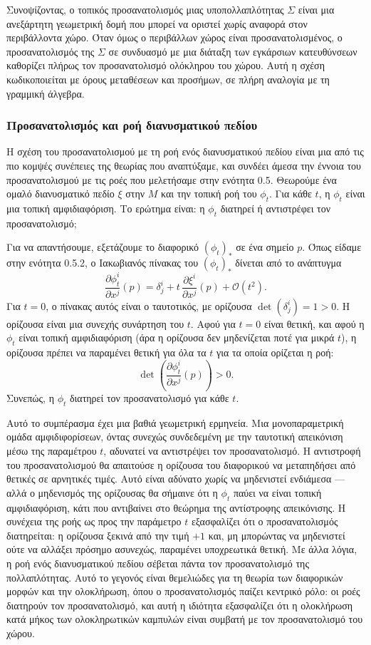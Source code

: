 \documentclass[12pt]{article}
\begin{document}
Συνοψίζοντας, ο τοπικός προσανατολισμός μιας υποπολλαπλότητας $\Sigma$ είναι μια ανεξάρτητη γεωμετρική δομή που μπορεί να οριστεί χωρίς αναφορά στον περιβάλλοντα χώρο. Όταν όμως ο περιβάλλων χώρος είναι προσανατολισμένος, ο προσανατολισμός της $\Sigma$ σε συνδυασμό με μια διάταξη των εγκάρσιων κατευθύνσεων καθορίζει πλήρως τον προσανατολισμό ολόκληρου του χώρου. Αυτή η σχέση κωδικοποιείται με όρους μεταθέσεων και προσήμων, σε πλήρη αναλογία με τη γραμμική άλγεβρα.

\subsubsection{Προσανατολισμός και ροή διανυσματικού πεδίου}

Η σχέση του προσανατολισμού με τη ροή ενός διανυσματικού πεδίου είναι μια από τις πιο κομψές συνέπειες της θεωρίας που αναπτύξαμε, και συνδέει άμεσα την έννοια του προσανατολισμού με τις ροές που μελετήσαμε στην ενότητα 0.5. Θεωρούμε ένα ομαλό διανυσματικό πεδίο $\xi$ στην $M$ και την τοπική ροή του $\phi_t$. Για κάθε $t$, η $\phi_t$ είναι μια τοπική αμφιδιαφόριση. Το ερώτημα είναι: η $\phi_t$ διατηρεί ή αντιστρέφει τον προσανατολισμό;

Για να απαντήσουμε, εξετάζουμε το διαφορικό $(\phi_t)_*$ σε ένα σημείο $p$. Όπως είδαμε στην ενότητα 0.5.2, ο Ιακωβιανός πίνακας του $(\phi_t)_*$ δίνεται από το ανάπτυγμα
\[
\frac{\partial \phi_t^i}{\partial x^j}(p) = \delta^i_j + t \, \frac{\partial \xi^i}{\partial x^j}(p) + \mathcal{O}(t^2).
\]
Για $t = 0$, ο πίνακας αυτός είναι ο ταυτοτικός, με ορίζουσα $\det(\delta^i_j) = 1 > 0$. Η ορίζουσα είναι μια συνεχής συνάρτηση του $t$. Αφού για $t = 0$ είναι θετική, και αφού η $\phi_t$ είναι τοπική αμφιδιαφόριση (άρα η ορίζουσα δεν μηδενίζεται ποτέ για μικρά $t$), η ορίζουσα πρέπει να παραμένει θετική για όλα τα $t$ για τα οποία ορίζεται η ροή:
\[
\det \left( \frac{\partial \phi_t^i}{\partial x^j}(p) \right) > 0.
\]
Συνεπώς, η $\phi_t$ διατηρεί τον προσανατολισμό για κάθε $t$.

Αυτό το συμπέρασμα έχει μια βαθιά γεωμετρική ερμηνεία. Μια μονοπαραμετρική ομάδα αμφιδιφορίσεων, όντας συνεχώς συνδεδεμένη με την ταυτοτική απεικόνιση μέσω της παραμέτρου $t$, αδυνατεί να αντιστρέψει τον προσανατολισμό. Η αντιστροφή του προσανατολισμού θα απαιτούσε η ορίζουσα του διαφορικού να μεταπηδήσει από θετικές σε αρνητικές τιμές. Αυτό είναι αδύνατο χωρίς να μηδενιστεί ενδιάμεσα --- αλλά ο μηδενισμός της ορίζουσας θα σήμαινε ότι η $\phi_t$ παύει να είναι τοπική αμφιδιαφόριση, κάτι που αντιβαίνει στο θεώρημα της αντίστροφης απεικόνισης. Η συνέχεια της ροής ως προς την παράμετρο $t$ εξασφαλίζει ότι ο προσανατολισμός διατηρείται: η ορίζουσα ξεκινά από την τιμή $+1$ και, μη μπορώντας να μηδενιστεί ούτε να αλλάξει πρόσημο ασυνεχώς, παραμένει υποχρεωτικά θετική. Με άλλα λόγια, η ροή ενός διανυσματικού πεδίου σέβεται πάντα τον προσανατολισμό της πολλαπλότητας. Αυτό το γεγονός είναι θεμελιώδες για τη θεωρία των διαφορικών μορφών και την ολοκλήρωση, όπου ο προσανατολισμός παίζει κεντρικό ρόλο: οι ροές διατηρούν τον προσανατολισμό, και αυτή η ιδιότητα εξασφαλίζει ότι η ολοκλήρωση κατά μήκος των ολοκληρωτικών καμπυλών είναι συμβατή με τον προσανατολισμό του χώρου.
\end{document}
